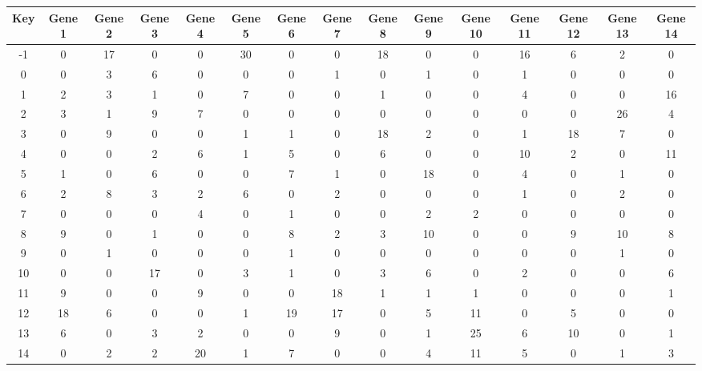 \begin{tabular}{|c|c|c|c|c|c|c|c|c|c|c|c|c|c|c|}
\hline
Key & Gene 1 & Gene 2 & Gene 3 & Gene 4 & Gene 5 & Gene 6 & Gene 7 & Gene 8 & Gene 9 & Gene 10 & Gene 11 & Gene 12 & Gene 13 & Gene 14 \\
\hline
-1 & 0 & 17 & 0 & 0 & 30 & 0 & 0 & 18 & 0 & 0 & 16 & 6 & 2 & 0 \\
0 & 0 & 3 & 6 & 0 & 0 & 0 & 1 & 0 & 1 & 0 & 1 & 0 & 0 & 0 \\
1 & 2 & 3 & 1 & 0 & 7 & 0 & 0 & 1 & 0 & 0 & 4 & 0 & 0 & 16 \\
2 & 3 & 1 & 9 & 7 & 0 & 0 & 0 & 0 & 0 & 0 & 0 & 0 & 26 & 4 \\
3 & 0 & 9 & 0 & 0 & 1 & 1 & 0 & 18 & 2 & 0 & 1 & 18 & 7 & 0 \\
4 & 0 & 0 & 2 & 6 & 1 & 5 & 0 & 6 & 0 & 0 & 10 & 2 & 0 & 11 \\
5 & 1 & 0 & 6 & 0 & 0 & 7 & 1 & 0 & 18 & 0 & 4 & 0 & 1 & 0 \\
6 & 2 & 8 & 3 & 2 & 6 & 0 & 2 & 0 & 0 & 0 & 1 & 0 & 2 & 0 \\
7 & 0 & 0 & 0 & 4 & 0 & 1 & 0 & 0 & 2 & 2 & 0 & 0 & 0 & 0 \\
8 & 9 & 0 & 1 & 0 & 0 & 8 & 2 & 3 & 10 & 0 & 0 & 9 & 10 & 8 \\
9 & 0 & 1 & 0 & 0 & 0 & 1 & 0 & 0 & 0 & 0 & 0 & 0 & 1 & 0 \\
10 & 0 & 0 & 17 & 0 & 3 & 1 & 0 & 3 & 6 & 0 & 2 & 0 & 0 & 6 \\
11 & 9 & 0 & 0 & 9 & 0 & 0 & 18 & 1 & 1 & 1 & 0 & 0 & 0 & 1 \\
12 & 18 & 6 & 0 & 0 & 1 & 19 & 17 & 0 & 5 & 11 & 0 & 5 & 0 & 0 \\
13 & 6 & 0 & 3 & 2 & 0 & 0 & 9 & 0 & 1 & 25 & 6 & 10 & 0 & 1 \\
14 & 0 & 2 & 2 & 20 & 1 & 7 & 0 & 0 & 4 & 11 & 5 & 0 & 1 & 3 \\
\hline
\end{tabular}